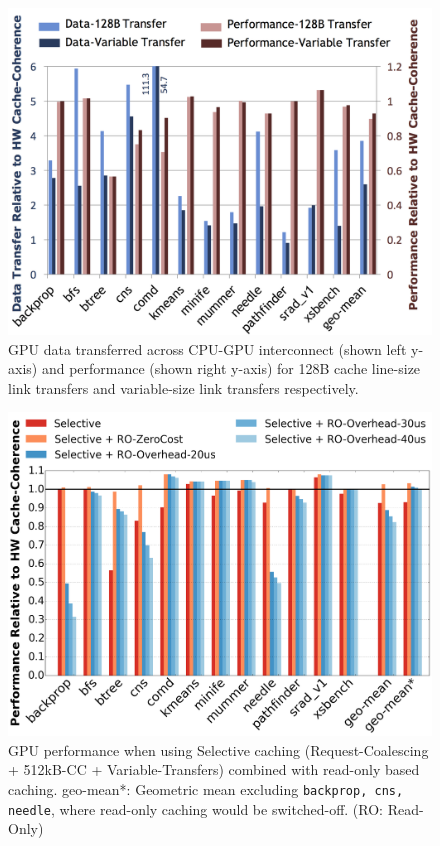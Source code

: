 \begin{figure}[t]
\includegraphics[width=1.0\columnwidth]{hpca2016/figures/linkimprovements.png}
\caption{GPU data transferred across CPU-GPU interconnect (shown left y-axis) and performance (shown right y-axis)
for 128B cache line-size link transfers and variable-size link transfers respectively.}
\label{fig:linkoptimization}
\end{figure}

\begin{figure}[t]
\includegraphics[width=1.0\columnwidth]{hpca2016/figures/readonlycaching.png}
\caption{GPU performance when using Selective caching (Request-Coalescing +
512kB-CC + Variable-Transfers) combined with read-only
based caching. geo-mean*: Geometric mean excluding \texttt{backprop, cns,
needle}, where read-only caching would be switched-off. (RO: Read-Only)}
\label{fig:readonlycaching}
\vspace{-0.1in}
\end{figure}

